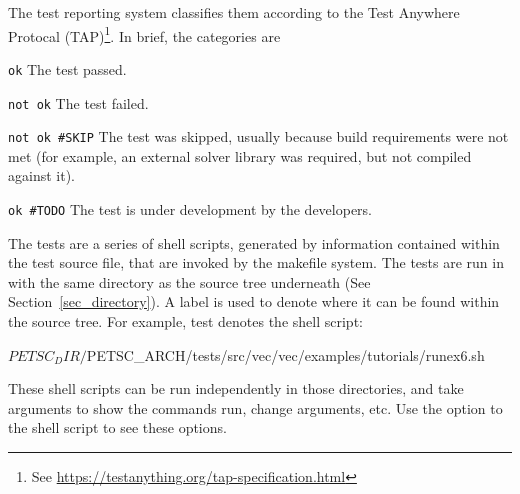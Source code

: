 The test reporting system classifies them according to the Test Anywhere
Protocal (TAP)\footnote{See \url{https://testanything.org/tap-specification.html}}.
In brief, the categories are
\begin{tightitemize}
  \item \lstinline{ok}
  \subitem The test passed.
\item \lstinline{not ok}
  \subitem The test failed.
\item \lstinline{not ok #SKIP}
  \subitem The test was skipped, usually because build requirements were not
  met (for example, an external solver library was required, but not
  compiled against it).
\item \lstinline{ok #TODO}
  \subitem The test is under development by the developers.
\end{tightitemize}

The tests are a series of shell scripts, generated by information
contained within the test source file, that are invoked by the makefile
system.  The tests are run in 
with the same directory as the source tree underneath 
(See Section~\ref{sec_directory}).  
A label is used to denote where it can be found within the source tree.
For example, test  denotes the shell
script:
\begin{bashlisting}
${PETSC_DIR}/${PETSC_ARCH}/tests/src/vec/vec/examples/tutorials/runex6.sh 
\end{bashlisting}
These shell scripts can be run independently in those directories, and
take arguments to show the commands run, change arguments, etc.  Use the
 option to the shell script to see these options.

